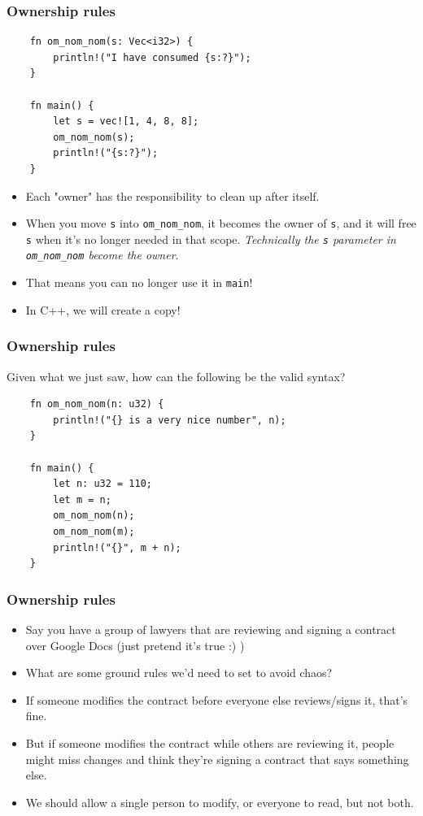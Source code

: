 \documentclass[aspectratio=1610,t]{beamer}
\begin{document}

\begin{frame}[fragile]
\frametitle{Ownership rules}
\begin{verbatim}
    fn om_nom_nom(s: Vec<i32>) {
        println!("I have consumed {s:?}");
    }

    fn main() {
        let s = vec![1, 4, 8, 8];
        om_nom_nom(s);
        println!("{s:?}");
    }
\end{verbatim}

\begin{itemize}
    \item Each "owner" has the responsibility to clean up after itself.
    \item When you move \texttt{s} into \texttt{om\_nom\_nom}, it becomes the owner of \texttt{s}, and it will free \texttt{s} when it’s no longer needed in that scope. \textit{Technically the \texttt{s} parameter in \texttt{om\_nom\_nom} become the owner}.
    \item That means you can no longer use it in \texttt{main}!
    \item In C++, we will create a copy!
\end{itemize}
\end{frame}


\begin{frame}[fragile]
\frametitle{Ownership rules}
Given what we just saw, how can the following be the valid syntax?

\begin{verbatim}
    fn om_nom_nom(n: u32) {
        println!("{} is a very nice number", n);
    }

    fn main() {
        let n: u32 = 110;
        let m = n;
        om_nom_nom(n);
        om_nom_nom(m);
        println!("{}", m + n);
    }
\end{verbatim}
\end{frame}


\begin{frame}[fragile]
\frametitle{Ownership rules}
\begin{itemize}
    \item Say you have a group of lawyers that are reviewing and signing a contract over Google Docs (just pretend it's true :) )
    \item What are some ground rules we'd need to set to avoid chaos?
    \item If someone modifies the contract before everyone else reviews/signs it, that's fine.
    \item But if someone modifies the contract while others are reviewing it, people might miss changes and think they're signing a contract that says something else.
    \item We should allow a single person to modify, or everyone to read, but not both.
\end{itemize}
\end{frame}
\end{document}
